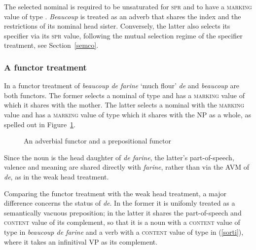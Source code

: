 \documentclass[output=paper
                ,modfonts
                ,nonflat
	        ,collection
	        ,collectionchapter
	        ,collectiontoclongg
 	        ,biblatex
                ,babelshorthands
                ,newtxmath
                ,draftmode
                ,colorlinks, citecolor=brown
]{./langsci/langscibook}
\begin{document}
\noindent
The selected nominal is required to be unsaturated for \textsc{spr} and to have a 
\textsc{marking} value of type . \emph{Beaucoup} is treated as an adverb that  
shares the index and the restrictions of its nominal head sister. Conversely, the latter
also selects its specifier via its \textsc{spr} value, following the mutual 
selection regime of the specifier treatment, see Section~\ref{semco}.


\subsubsection{A functor treatment} 


In a functor treatment of \emph{beaucoup de farine} `much flour' \emph{de} and 
\emph{beaucoup} are both functors. The former selects a nominal of type  and 
has a \textsc{marking} value of  which it shares with the mother. 
The latter selects a nominal with the \textsc{marking} value 
 and has a \textsc{marking} value of type  which it 
shares with the NP as a whole, as spelled out in Figure~\ref{beau}.

\begin{figure}
\centering
{}
\caption{\label{beau} An adverbial functor and a prepositional functor}
\end{figure}

Since the noun is the head daughter of \emph{de farine}, the latter's 
part-of-speech, valence and meaning are shared directly with \emph{farine}, 
rather than via the AVM of \emph{de}, as in the weak head treatment. 

Comparing the functor treatment with the weak head treatment,  
a major difference concerns the status of \emph{de}. In the former it is 
unifomly treated as a semantically vacuous preposition; in the latter it shares 
the part-of-speech and \textsc{content} value of its complement, so that it is 
a noun with a \textsc{content} value of type  in 
\emph{beaucoup de farine} and a verb with a \textsc{content} value of type 
 in (\ref{sorti}), where it takes 
an infinitival VP as its complement.   
\end{document}
